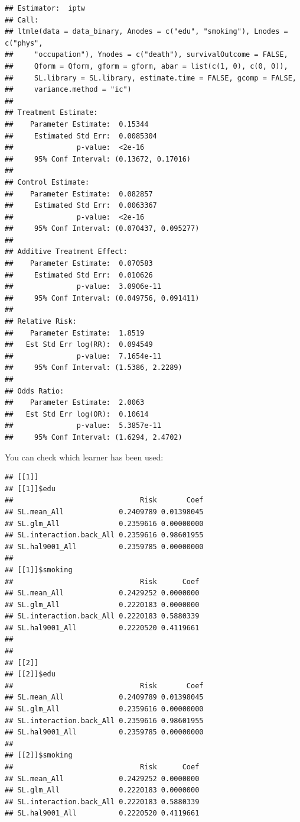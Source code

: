\documentclass[
]{book}
\newenvironment{Shaded}{\begin{snugshade}}{\end{snugshade}}
\newcommand{\DocumentationTok}[1]{\textcolor[rgb]{0.56,0.35,0.01}{\textbf{\textit{#1}}}}
\newcommand{\NormalTok}[1]{#1}
\newcommand{\SpecialCharTok}[1]{\textcolor[rgb]{0.81,0.36,0.00}{\textbf{#1}}}
\begin{document}
\begin{verbatim}
## Estimator:  iptw 
## Call:
## ltmle(data = data_binary, Anodes = c("edu", "smoking"), Lnodes = c("phys", 
##     "occupation"), Ynodes = c("death"), survivalOutcome = FALSE, 
##     Qform = Qform, gform = gform, abar = list(c(1, 0), c(0, 0)), 
##     SL.library = SL.library, estimate.time = FALSE, gcomp = FALSE, 
##     variance.method = "ic")
## 
## Treatment Estimate:
##    Parameter Estimate:  0.15344 
##     Estimated Std Err:  0.0085304 
##               p-value:  <2e-16 
##     95% Conf Interval: (0.13672, 0.17016) 
## 
## Control Estimate:
##    Parameter Estimate:  0.082857 
##     Estimated Std Err:  0.0063367 
##               p-value:  <2e-16 
##     95% Conf Interval: (0.070437, 0.095277) 
## 
## Additive Treatment Effect:
##    Parameter Estimate:  0.070583 
##     Estimated Std Err:  0.010626 
##               p-value:  3.0906e-11 
##     95% Conf Interval: (0.049756, 0.091411) 
## 
## Relative Risk:
##    Parameter Estimate:  1.8519 
##   Est Std Err log(RR):  0.094549 
##               p-value:  7.1654e-11 
##     95% Conf Interval: (1.5386, 2.2289) 
## 
## Odds Ratio:
##    Parameter Estimate:  2.0063 
##   Est Std Err log(OR):  0.10614 
##               p-value:  5.3857e-11 
##     95% Conf Interval: (1.6294, 2.4702)
\end{verbatim}

You can check which learner has been used:

\begin{Shaded}
\end{Shaded}

\begin{verbatim}
## [[1]]
## [[1]]$edu
##                              Risk       Coef
## SL.mean_All             0.2409789 0.01398045
## SL.glm_All              0.2359616 0.00000000
## SL.interaction.back_All 0.2359616 0.98601955
## SL.hal9001_All          0.2359785 0.00000000
## 
## [[1]]$smoking
##                              Risk      Coef
## SL.mean_All             0.2429252 0.0000000
## SL.glm_All              0.2220183 0.0000000
## SL.interaction.back_All 0.2220183 0.5880339
## SL.hal9001_All          0.2220520 0.4119661
## 
## 
## [[2]]
## [[2]]$edu
##                              Risk       Coef
## SL.mean_All             0.2409789 0.01398045
## SL.glm_All              0.2359616 0.00000000
## SL.interaction.back_All 0.2359616 0.98601955
## SL.hal9001_All          0.2359785 0.00000000
## 
## [[2]]$smoking
##                              Risk      Coef
## SL.mean_All             0.2429252 0.0000000
## SL.glm_All              0.2220183 0.0000000
## SL.interaction.back_All 0.2220183 0.5880339
## SL.hal9001_All          0.2220520 0.4119661
\end{verbatim}
\end{document}
